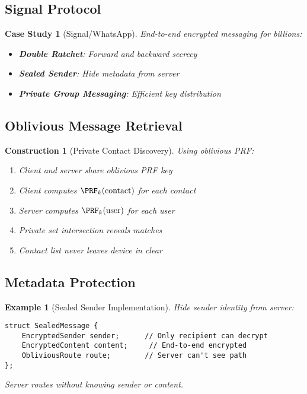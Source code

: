 \documentclass[11pt,final,hidelinks]{article}
\newtheorem{example}[theorem]{Example}
\newtheorem{construction}[theorem]{Construction}
\newtheorem{casestudy}[theorem]{Case Study}
\begin{document}
\subsection{Signal Protocol}

\begin{casestudy}[Signal/WhatsApp]
End-to-end encrypted messaging for billions:
\begin{itemize}
    \item \textbf{Double Ratchet}: Forward and backward secrecy
    \item \textbf{Sealed Sender}: Hide metadata from server
    \item \textbf{Private Group Messaging}: Efficient key distribution
\end{itemize}
\end{casestudy}

\subsection{Oblivious Message Retrieval}

\begin{construction}[Private Contact Discovery]
Using oblivious PRF:
\begin{enumerate}
    \item Client and server share oblivious PRF key
    \item Client computes $\PRF_k(\text{contact})$ for each contact
    \item Server computes $\PRF_k(\text{user})$ for each user
    \item Private set intersection reveals matches
    \item Contact list never leaves device in clear
\end{enumerate}
\end{construction}

\subsection{Metadata Protection}

\begin{example}[Sealed Sender Implementation]
Hide sender identity from server:
\begin{verbatim}
struct SealedMessage {
    EncryptedSender sender;      // Only recipient can decrypt
    EncryptedContent content;     // End-to-end encrypted
    ObliviousRoute route;        // Server can't see path
};
\end{verbatim}
Server routes without knowing sender or content.
\end{example}
\end{document}
